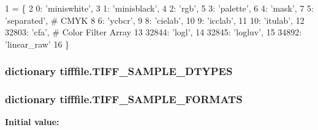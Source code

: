 \begin{DoxyCode}
1 = \{
2     0: \textcolor{stringliteral}{'miniswhite'},
3     1: \textcolor{stringliteral}{'minisblack'},
4     2: \textcolor{stringliteral}{'rgb'},
5     3: \textcolor{stringliteral}{'palette'},
6     4: \textcolor{stringliteral}{'mask'},
7     5: \textcolor{stringliteral}{'separated'},  \textcolor{comment}{# CMYK}
8     6: \textcolor{stringliteral}{'ycbcr'},
9     8: \textcolor{stringliteral}{'cielab'},
10     9: \textcolor{stringliteral}{'icclab'},
11     10: \textcolor{stringliteral}{'itulab'},
12     32803: \textcolor{stringliteral}{'cfa'},  \textcolor{comment}{# Color Filter Array}
13     32844: \textcolor{stringliteral}{'logl'},
14     32845: \textcolor{stringliteral}{'logluv'},
15     34892: \textcolor{stringliteral}{'linear\_raw'}
16 \}
\end{DoxyCode}
\hypertarget{namespacetifffile_aa50c5aae5811b01e35a37d838f782915}{
\subsubsection[{T\-I\-F\-F\-\_\-\-S\-A\-M\-P\-L\-E\-\_\-\-D\-T\-Y\-P\-E\-S}]{\setlength{\rightskip}{0pt plus 5cm}dictionary tifffile.\-T\-I\-F\-F\-\_\-\-S\-A\-M\-P\-L\-E\-\_\-\-D\-T\-Y\-P\-E\-S}}\label{namespacetifffile_aa50c5aae5811b01e35a37d838f782915}
\hypertarget{namespacetifffile_a9bcd5aeb8436eb2d98a761a1a6efa5b9}{
\subsubsection[{T\-I\-F\-F\-\_\-\-S\-A\-M\-P\-L\-E\-\_\-\-F\-O\-R\-M\-A\-T\-S}]{\setlength{\rightskip}{0pt plus 5cm}dictionary tifffile.\-T\-I\-F\-F\-\_\-\-S\-A\-M\-P\-L\-E\-\_\-\-F\-O\-R\-M\-A\-T\-S}}\label{namespacetifffile_a9bcd5aeb8436eb2d98a761a1a6efa5b9}
{\bfseries Initial value\-:}

